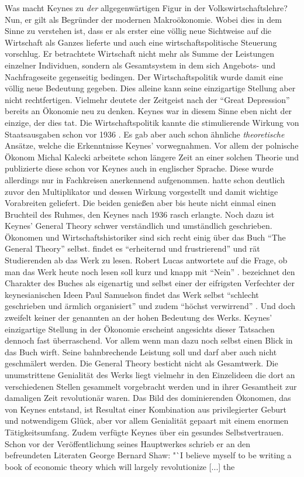 Was macht Keynes zu \textit{der} allgegenwärtigen Figur in der Volkswirtschaftslehre? Nun, er gilt als Begründer der modernen Makroökonomie. Wobei dies in dem Sinne zu verstehen ist, dass er als erster eine völlig neue Sichtweise auf die Wirtschaft als Ganzes lieferte und auch eine wirtschaftspolitische Steuerung vorschlug. Er betrachtete Wirtschaft nicht mehr als Summe der Leistungen einzelner Individuen, sondern als Gesamtsystem in dem sich Angebots- und Nachfrageseite gegenseitig bedingen. Der Wirtschaftspolitik wurde damit eine völlig neue Bedeutung gegeben. Dies alleine kann seine einzigartige Stellung aber nicht rechtfertigen. Vielmehr deutete der Zeitgeist nach der "`Great Depression"' bereits an Ökonomie neu zu denken. Keynes war in diesem Sinne eben nicht der einzige, der dies tat. Die Wirtschaftspolitik kannte die stimulierende Wirkung von Staatsausgaben schon vor 1936 \parencite{Fishback2010}. Es gab aber auch schon ähnliche \textit{theoretische} Ansätze, welche die Erkenntnisse Keynes' vorwegnahmen. Vor allem der polnische Ökonom Michal Kalecki arbeitete schon längere Zeit an einer solchen Theorie und publizierte diese \parencite{Kalecki1935} schon vor Keynes auch in englischer Sprache. Diese wurde allerdings nur in Fachkreisen anerkennend aufgenommen. \textcite{Kahn1931} hatte schon deutlich zuvor den Multiplikator und dessen Wirkung vorgestellt und damit wichtige Vorabreiten geliefert. Die beiden genießen aber bis heute nicht einmal einen Bruchteil des Ruhmes, den Keynes nach 1936 rasch erlangte. Noch dazu ist Keynes' General Theory schwer verständlich und umständlich geschrieben. Ökonomen und Wirtschaftshistoriker sind sich recht einig über das Buch "`The General Theory"' selbst. \textcite [S. 31]{Mankiw2006} findet es "`erheiternd und frustrierend"' und rät Studierenden ab das Werk zu lesen. Robert Lucas antwortete auf die Frage, ob man das Werk heute noch lesen soll kurz und knapp mit "`Nein"' \parencite{Lucas2013}. \textcite[S. 429]{Rosner2012} bezeichnet den Charakter des Buches als eigenartig und selbst einer der eifrigsten Verfechter der keynesianischen Ideen Paul Samuelson findet das Werk selbst "`schlecht geschrieben und ärmlich organisiert"' und zudem "`höchst verwirrend"' \parencite[S. 190]{Samuelson1946}. Und doch zweifelt keiner der genannten an der hohen Bedeutung des Werks. Keynes' einzigartige Stellung in der Ökonomie erscheint angesichts dieser Tatsachen dennoch fast überraschend. Vor allem wenn man dazu noch selbst einen Blick in das Buch wirft. Seine bahnbrechende Leistung soll und darf aber auch nicht geschmälert werden. Die General Theory besticht nicht als Gesamtwerk. Die unumstrittene Genialität des Werks liegt vielmehr in den Einzelideen die dort an verschiedenen Stellen gesammelt vorgebracht werden und in ihrer Gesamtheit zur damaligen Zeit revolutionär waren. Das Bild des dominierenden Ökonomen, das von Keynes entstand, ist Resultat einer Kombination aus privilegierter Geburt und notwendigem Glück, aber vor allem Genialität gepaart mit einem enormen Tätigkeitsumfang. Zudem verfügte Keynes über ein gesundes Selbstvertrauen. Schon vor der Veröffentlichung seines Hauptwerkes schrieb er an den befreundeten Literaten George Bernard Shaw: "`I believe myself to be writing a book of economic theory which will largely revolutionize [...] the 